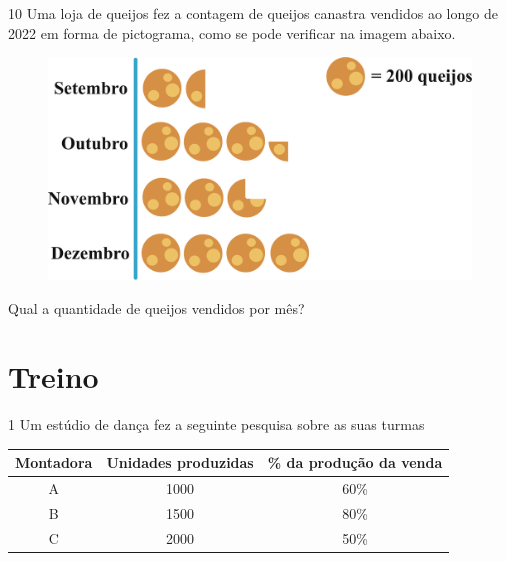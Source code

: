 
\pagebreak
\num{10} Uma loja de queijos fez a contagem de queijos canastra vendidos ao
longo de 2022 em forma de pictograma, como se pode verificar na imagem abaixo. 

\begin{figure}[htpb!]
\centering
\includegraphics[width=\textwidth]{./ilustras-mat/modulo_13-atividade_10.png}
\end{figure}

Qual a quantidade de queijos vendidos por mês?


\section*{Treino}

\num{1}
  Um estúdio de dança fez a seguinte pesquisa sobre as suas turmas 

\begin{center}
\begin{tabular}{c|c|c}
\hline
\multicolumn{1}{|c|}{\textbf{Montadora}} & \textbf{Unidades produzidas} & \multicolumn{1}{c|}{\textbf{\% da produção da venda}} \\ \hline
A & 1000 & 60\% \\ \hline
B & 1500 & 80\% \\ \hline
C & 2000 & 50\% \\ \hline
\end{tabular}
\end{center}

